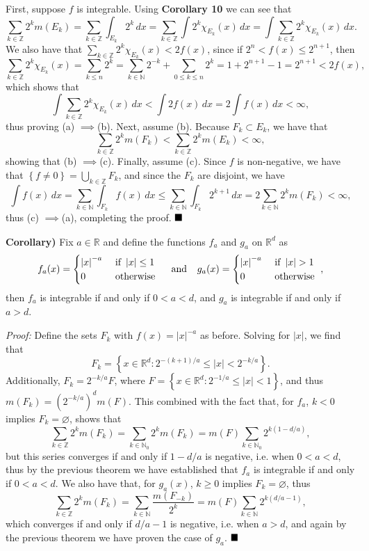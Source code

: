 \documentclass[12pt]{article}
\newcommand{\N}{\ensuremath{\mathbb{N}}}
\newcommand{\Z}{\ensuremath{\mathbb{Z}}}
\newcommand{\R}{\ensuremath{\mathbb{R}}}
\newcommand{\braceb}[1]{\left\{#1\right\}}
\newcommand{\vertb}[1]{\left\vert#1\right\vert}
\newcommand{\proof}{\textit{Proof: }}
\newcommand{\done}{\ensuremath{\strut\hfill\blacksquare}}
\renewcommand{\t}[1]{\text{ #1 }}
\newcommand{\impl}{\ensuremath{\implies}}
\begin{document}
First, suppose \( f \) is integrable.
Using \textbf{Corollary 10} we can see that
\[
	\sum_{k \in \Z} 2^km(E_k)
	= \sum_{k \in \Z} \int_{E_k} 2^k \, dx
	= \sum_{k \in \Z} \int 2^k\chi_{E_k}(x) \, dx
	= \int \sum_{k \in \Z} 2^k\chi_{E_k}(x) \, dx.
\]
We also have that \( \sum_{k \in \Z} 2^k\chi_{E_k}(x) < 2f(x) \), since if
\( 2^n < f(x) \leq 2^{n + 1} \), then
\[
	\sum_{k \in \Z} 2^k\chi_{E_k}(x)
	= \sum_{k \leq n} 2^k
	= \sum_{k \in \N} 2^{-k} + \sum_{0 \leq k \leq n} 2^k
	= 1 + 2^{n + 1} - 1
	= 2^{n + 1}
	< 2f(x),
\]
which shows that
\[
	\int \sum_{k \in \Z} 2^k\chi_{E_k}(x) \, dx
	< \int 2f(x) \, dx
	= 2 \int f(x) \, dx
	< \infty,
\]
thus proving (a) \impl (b).
Next, assume (b).
Because \( F_k \subset E_k \), we have that
\[
	\sum_{k \in \Z} 2^km(F_k)
	< \sum_{k \in \Z} 2^km(E_k)
	< \infty,
\]
showing that (b) \impl (c).
Finally, assume (c).
Since \( f \) is non-negative, we have that
\( \braceb{f \ne 0} = \bigcup_{k \in \Z} F_k \), and since the \( F_k \) are
disjoint, we have
\[
	\int f(x) \, dx
	= \sum_{k \in \N} \int_{F_k} f(x) \, dx
	\leq \sum_{k \in \N} \int_{F_k} 2^{k + 1} \, dx
	= 2 \sum_{k \in \N} 2^km(F_k)
	< \infty,
\]
thus (c) \impl (a), completing the proof.
\done

\textbf{Corollary)}
Fix \( a \in \R \) and define the functions \( f_a \) and \( g_a \) on
\( \R^d \) as
\[
	f_a(x) = \begin{cases}
		\vertb{x}^{-a} & \t{if} \vertb{x} \leq 1 \\
		0              & \t{otherwise}
	\end{cases}
	\hspace{0.1in}
	\t{and}
	\hspace{0.1in}
	g_a(x) = \begin{cases}
		\vertb{x}^{-a} & \t{if} \vertb{x} > 1 \\
		0              & \t{otherwise}
	\end{cases},
\]
then \( f_a \) is integrable if and only if \( 0 < a < d \), and \( g_a \) is
integrable if and only if \( a > d \).

\proof
Define the sets \( F_k \) with \( f(x) = \vertb{x}^{-a} \) as before.
Solving for \( \vertb{x} \), we find that
\[
	F_k = \braceb{x \in \R^d : 2^{-(k + 1)/a} \leq \vertb{x} < 2^{-k/a}}.
\]
Additionally, \( F_k = 2^{-k/a}F \), where
\( F = \braceb{x \in \R^d : 2^{-1/a} \leq \vertb{x} < 1} \), and thus
\( m(F_k) = (2^{-k/a})^dm(F) \).
This combined with the fact that, for \( f_a \), \( k < 0 \) implies
\( F_k = \varnothing \), shows that
\[
	\sum_{k \in \Z} 2^km(F_k)
	= \sum_{k \in \N_0} 2^km(F_k)
	= m(F) \sum_{k \in \N_0} 2^{k(1 - d/a)},
\]
but this series converges if and only if \( 1 - d/a \) is negative, i.e. when
\( 0 < a < d \), thus by the previous theorem we have established that
\( f_a \) is integrable if and only if \( 0 < a < d \).
We also have that, for \( g_a(x) \), \( k \geq 0 \) implies
\( F_k = \varnothing \), thus
\[
	\sum_{k \in \Z} 2^km(F_k)
	= \sum_{k \in \N} \frac{m(F_{-k})}{2^k}
	= m(F) \sum_{k \in \N} 2^{k(d/a - 1)},
\]
which converges if and only if \( d/a - 1 \) is negative, i.e. when \( a > d \),
and again by the previous theorem we have proven the case of \( g_a \).
\done
\end{document}
